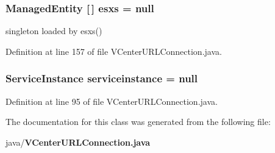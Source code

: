 \subsubsection[{esxs}]{\setlength{\rightskip}{0pt plus 5cm}Managed\+Entity [$\,$] esxs = null\hspace{0.3cm}{\ttfamily [protected]}}\label{classorg_1_1smallfoot_1_1parser_1_1vmware_1_1VCenterURLConnection_a33f211087f486d6a140a235e1218c93c}


singleton loaded by esxs() 



Definition at line 157 of file V\+Center\+U\+R\+L\+Connection.\+java.

\subsubsection[{serviceinstance}]{\setlength{\rightskip}{0pt plus 5cm}Service\+Instance serviceinstance = null\hspace{0.3cm}{\ttfamily [protected]}}\label{classorg_1_1smallfoot_1_1parser_1_1vmware_1_1VCenterURLConnection_a0766f2c999f41d3990f184648d52ff57}


Definition at line 95 of file V\+Center\+U\+R\+L\+Connection.\+java.



The documentation for this class was generated from the following file\+:\begin{DoxyCompactItemize}
\item 
java/{\bf V\+Center\+U\+R\+L\+Connection.\+java}\end{DoxyCompactItemize}
